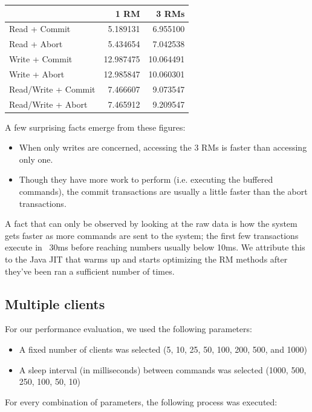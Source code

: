 \documentclass[10pt]{article}
\begin{document}
\begin{tabular}{l|r|r}
  ~ & 1 RM & 3 RMs \\
  \hline
  Read + Commit  & 5.189131 & 6.955100 \\
  Read + Abort   & 5.434654 & 7.042538 \\
  Write + Commit & 12.987475 & 10.064491 \\
  Write + Abort  & 12.985847 & 10.060301 \\
  Read/Write + Commit & 7.466607 & 9.073547 \\
  Read/Write + Abort  & 7.465912 & 9.209547 \\
\end{tabular}

A few surprising facts emerge from these figures:

\begin{itemize}
  \item When only writes are concerned, accessing the 3 RMs is faster
    than accessing only one.
  \item Though they have more work to perform (i.e. executing the
    buffered commands), the commit transactions are usually a little
    faster than the abort transactions.
\end{itemize}

A fact that can only be observed by looking at the raw data is how the
system gets faster as more commands are sent to the system; the first
few transactions execute in ~30ms before reaching numbers usually
below 10ms.  We attribute this to the Java JIT that warms up and
starts optimizing the RM methods after they've been ran a sufficient
number of times.

\subsection{Multiple clients}

For our performance evaluation, we used the following parameters:

\begin{itemize}
\item A fixed number of clients was selected (5, 10, 25, 50, 100, 200,
  500, and 1000)
\item A sleep interval (in milliseconds) between commands was selected
  (1000, 500, 250, 100, 50, 10)
\end{itemize}

For every combination of parameters, the following process was
executed:
\end{document}
